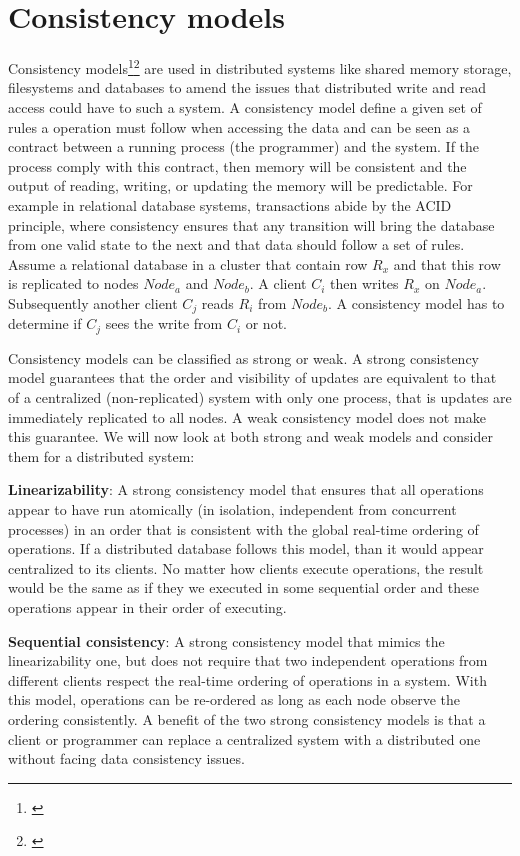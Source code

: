 \newpage
\section{Consistency models}

Consistency models\footnote{\cite{Takada2017}}\footnote{\cite{Abadi2012}} are used in distributed systems like shared memory storage, filesystems and databases to amend the issues that distributed write and read access could have to such a system. A consistency model define a given set of rules a operation must follow when accessing the data and can be seen as a contract between a running process (the programmer) and the system. If the process comply with this contract, then memory will be consistent and the output of reading, writing, or updating the memory will be predictable. For example in relational database systems, transactions abide by the ACID principle, where consistency ensures that any transition will bring the database from one valid state to the next and that data should follow a set of rules. Assume a relational database in a cluster that contain row $R_x$ and that this row is replicated to nodes $Node_a$ and $Node_b$. A client $C_i$ then writes $R_x$ on $Node_a$. Subsequently another client $C_j$ reads $R_i$ from $Node_b$. A consistency model has to determine if $C_j$ sees the write from $C_i$ or not.

\noindent Consistency models can be classified as strong or weak. A strong consistency model guarantees that the order and visibility of updates are equivalent to that of a centralized (non-replicated) system with only one process, that is updates are immediately replicated to all nodes. A weak consistency model does not make this guarantee. We will now look at both strong and weak models and consider them for a distributed system:

\noindent \textbf{Linearizability}: A strong consistency model that ensures that all operations appear to have run atomically (in isolation, independent from concurrent processes) in an order that is consistent with the global real-time ordering of operations. If a distributed database follows this model, than it would appear centralized to its clients. No matter how clients execute operations, the result would be the same as if they we executed in some sequential order and these operations appear in their order of executing.

\noindent \textbf{Sequential consistency}: A strong consistency model that mimics the linearizability one, but does not require that two independent operations from different clients respect the real-time ordering of operations in a system. With this model, operations can be re-ordered as long as each node observe the ordering consistently. A benefit of the two strong consistency models is that a client or programmer can replace a centralized system with a distributed one without facing data consistency issues.

